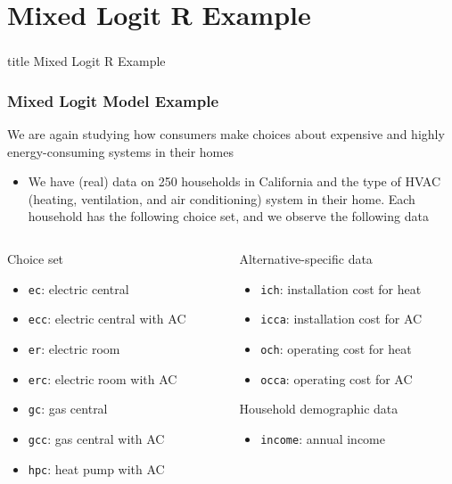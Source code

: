 \documentclass{beamer}
\begin{document}
\section{Mixed Logit R Example}
\label{example}
\begin{frame}\frametitle{}
    \vfill
    \centering
    \begin{beamercolorbox}[center]{title}
        \Large Mixed Logit R Example
    \end{beamercolorbox}
    \vfill
\end{frame}

\begin{frame}\frametitle{Mixed Logit Model Example}
    We are again studying how consumers make choices about expensive and highly energy-consuming systems in their homes
    \begin{itemize}
    	\item We have (real) data on 250 households in California and the type of HVAC (heating, ventilation, and air conditioning) system in their home. Each household has the following choice set, and we observe the following data
    \end{itemize}
    \vspace{2ex}
    \begin{columns}
    	\begin{column}{0.5\textwidth}
		    Choice set
		    \begin{itemize}
		    	\item \texttt{ec}: electric central
		    	\item \texttt{ecc}: electric central with AC
		    	\item \texttt{er}: electric room
		    	\item \texttt{erc}: electric room with AC
		    	\item \texttt{gc}: gas central
		    	\item \texttt{gcc}: gas central with AC
		    	\item \texttt{hpc}: heat pump with AC
		    \end{itemize}
	    \end{column}
	    \begin{column}{0.5\textwidth}
		    Alternative-specific data
		    \begin{itemize}
		    	\item \texttt{ich}: installation cost for heat
		    	\item \texttt{icca}: installation cost for AC
		    	\item \texttt{och}: operating cost for heat
		    	\item \texttt{occa}: operating cost for AC
		    \end{itemize}
		    \vspace{2ex}
		    Household demographic data
		    \begin{itemize}
		    	\item \texttt{income}: annual income
		    \end{itemize}
		    \vspace{1ex}
		\end{column}
    \end{columns}
\end{frame}
\end{document}
